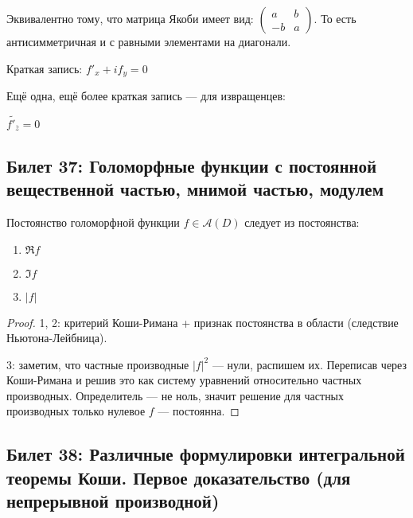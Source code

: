 \documentclass[12pt, a4paper, oneside]{memoir}
\begin{document}
\begin{remark}
    Эквивалентно тому, что матрица Якоби имеет вид: $\begin{pmatrix}
        a & b \\
        -b & a
    \end{pmatrix}$. То есть антисимметричная и с равными элементами на диагонали.
\end{remark}

\begin{remark}
    Краткая запись: $f'_x + i f_y = 0$
\end{remark}

\begin{remark}
    Ещё одна, ещё более краткая запись — для извращенцев:
    
    $\tilde{f'_{\overline{z}}} = 0$
\end{remark}

\subsection{Билет 37: Голоморфные функции с постоянной вещественной частью, мнимой частью, модулем}

\begin{theorem}
    Постоянство голоморфной функции $f \in \mathcal{A}(D)$ следует из постоянства:

    \begin{enumerate}
        \item $\Re f$
        \item $\Im f$
        \item $|f|$
    \end{enumerate}

    \begin{proof}
        1, 2: критерий Коши-Римана + признак постоянства в области (следствие Ньютона-Лейбница).

        3: заметим, что частные производные $|f|^2$ — нули, распишем их.
        Переписав через Коши-Римана и решив это как систему уравнений относительно частных производных.
        Определитель — не ноль, значит решение для частных производных только нулевое $f$ — постоянна.
    \end{proof}
\end{theorem}

\subsection{Билет 38: Различные формулировки интегральной теоремы Коши. Первое доказательство (для непрерывной производной)}
\end{document}
